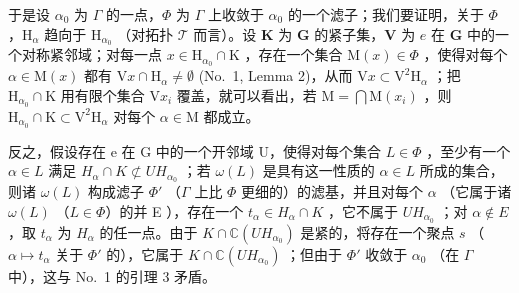 于是设 \(\alpha_0\) 为 \(\Gamma\) 的一点，\(\Phi\) 为 \(\Gamma\) 上收敛于 \(\alpha_0\) 的一个滤子；我们要证明，关于 \(\Phi\) ，\(\mathrm{H}_{\alpha}\) 趋向于 \(\mathrm{H}_{\alpha_0}\) （对拓扑 \(\mathcal{T}\) 而言）。设 \(\mathbf{K}\) 为 \(\mathbf{G}\) 的紧子集，\(\mathbf{V}\) 为 \(e\) 在 \(\mathbf{G}\) 中的一个对称紧邻域；对每一点 \(x \in \mathrm{H}_{\alpha_0} \cap \mathrm{K}\) ，存在一个集合 \(\mathrm{M}(x) \in \Phi\) ，使得对每个 \(\alpha \in \mathrm{M}(x)\) 都有 \(\mathrm{V}x \cap \mathrm{H}_{\alpha} \neq \emptyset\) (No.~1, Lemma 2)，从而 \(\mathrm{V}x \subset \mathrm{V}^2\mathrm{H}_{\alpha}\) ；把 \(\mathrm{H}_{\alpha_0} \cap \mathrm{K}\) 用有限个集合 \(\mathrm{V}x_i\) 覆盖，就可以看出，若 \(\mathrm{M} = \bigcap \mathrm{M}(x_i)\) ，则 \(\mathrm{H}_{\alpha_0} \cap \mathrm{K} \subset \mathrm{V}^2\mathrm{H}_{\alpha}\) 对每个 \(\alpha \in \mathrm{M}\) 都成立。

反之，假设存在 e 在 G 中的一个开邻域 U，使得对每个集合 \(L \in \Phi\) ，至少有一个 \(\alpha \in L\) 满足 \(H_{\alpha} \cap K \not\subset UH_{\alpha_{0}}\) ；若 \(\omega(L)\) 是具有这一性质的 \(\alpha \in L\) 所成的集合，则诸 \(\omega(L)\) 构成滤子 \(\Phi'\) （\(\Gamma\) 上比 \(\Phi\) 更细的）的滤基，并且对每个 \(\alpha\) （它属于诸 \(\omega(L)\) （\(L \in \Phi\)）的并 E ），存在一个 \(t_{\alpha} \in H_{\alpha} \cap K\) ，它不属于 \(UH_{\alpha_0}\) ；对 \(\alpha \notin E\) ，取 \(t_{\alpha}\) 为 \(H_{\alpha}\) 的任一点。由于 \(K \cap \mathbb{C}(UH_{\alpha_0})\) 是紧的，将存在一个聚点 \(s\) （\(\alpha \mapsto t_{\alpha}\) 关于 \(\Phi'\) 的），它属于 \(K \cap \mathbb{C}(UH_{\alpha_0})\) ；但由于 \(\Phi'\) 收敛于 \(\alpha_0\) （在 \(\Gamma\) 中），这与 No.~1 的引理 3 矛盾。

